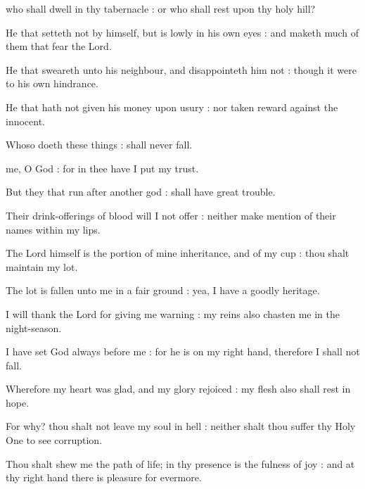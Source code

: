

 who shall dwell in thy tabernacle : or who shall rest upon thy holy hill?\par
{}
He that setteth not by himself, but is lowly in his own eyes : and maketh much of them that fear the Lord.\par
{}He that sweareth unto his neighbour, and disappointeth him not : though it were to his own hindrance.\par
{}He that hath not given his money upon usury : nor taken reward against the innocent.\par
{}Whoso doeth these things : shall never fall.\par


 me, O God : for in thee have I put my trust.\par
{}
But they that run after another god : shall have great trouble.\par
{}Their drink-offerings of blood will I not offer : neither make mention of their names within my lips.\par
{}The Lord himself is the portion of mine inheritance, and of my cup : thou shalt maintain my lot.\par
{}The lot is fallen unto me in a fair ground : yea, I have a goodly heritage.\par
{}I will thank the Lord for giving me warning : my reins also chasten me in the night-season.\par
{}I have set God always before me : for he is on my right hand, therefore I shall not fall.\par
{}Wherefore my heart was glad, and my glory rejoiced : my flesh also shall rest in hope.\par
{}For why? thou shalt not leave my soul in hell : neither shalt thou suffer thy Holy One to see corruption.\par
{}Thou shalt shew me the path of life; in thy presence is the fulness of joy : and at thy right hand there is pleasure for evermore.\par

